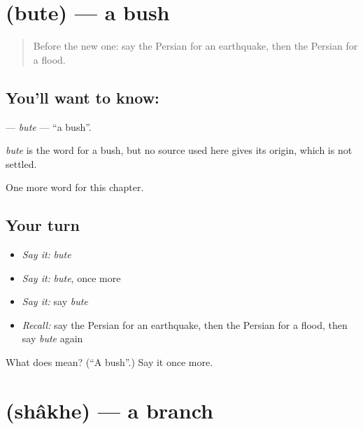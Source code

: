 \section[\texorpdfstring{\fa{بوته} (bute)}{بوته (bute)}]{ (bute) — a bush}

\label{lesson:FA-C244-bute}



\begin{quote}
Before the new one: say the Persian for an earthquake, then the Persian for a flood.
\end{quote}

\subsection*{You'll want to know: }
\textbf{} — \emph{bute} — \textquotedblleft{}a bush\textquotedblright{}.

\begin{cousinweb}
\emph{bute} is the word for a bush, but no source used here gives its origin, which is not settled.
\end{cousinweb}

\begin{grammarlens}[title={What you've built}]
One more word for this chapter.
\end{grammarlens}

\subsection*{Your turn}
\begin{itemize}
\raggedright
  \item \emph{Say it:} \emph{bute}
  \item \emph{Say it:} \emph{bute}, once more
  \item \emph{Say it:} say \emph{bute}
  \item \emph{Recall:} say the Persian for an earthquake, then the Persian for a flood, then say \emph{bute} again
\end{itemize}

\begin{tcolorbox}[breakable,colback=teal!4,colframe=teal!35!black,title={Before you move on}]
What does  mean? (\textquotedblleft{}A bush\textquotedblright{}.) Say it once more.
\end{tcolorbox}
\section[\texorpdfstring{\fa{شاخه} (shâkhe)}{شاخه (shâkhe)}]{ (shâkhe) — a branch}

